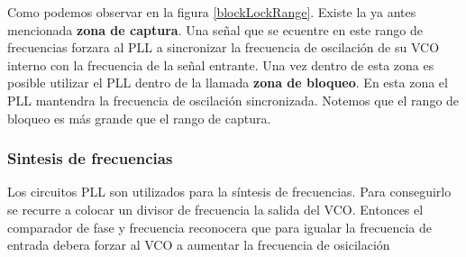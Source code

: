 Como podemos observar en la figura \ref{blockLockRange}. Existe la ya antes mencionada \textbf{zona de captura}. Una señal que se ecuentre en este rango de frecuencias forzara al PLL a sincronizar la frecuencia de oscilación de su VCO interno con la frecuencia de la señal entrante. Una vez dentro de esta zona es posible utilizar el PLL dentro de la llamada \textbf{zona de bloqueo}. En esta zona el PLL mantendra la frecuencia de oscilación sincronizada. Notemos que el rango de bloqueo es más grande que el rango de captura.

\subsubsection{Sintesis de frecuencias}
Los circuitos PLL son utilizados para la síntesis de frecuencias. Para conseguirlo se recurre a colocar un divisor de frecuencia  la salida del VCO. Entonces el comparador de fase y frecuencia reconocera que para igualar la frecuencia de entrada debera forzar al VCO a aumentar la frecuencia de osicilación




%

